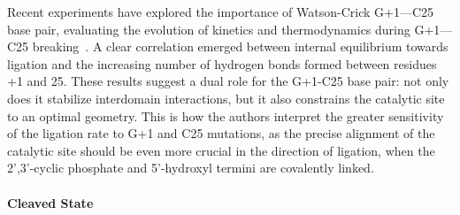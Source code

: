 \documentclass[journal=jacsat,manuscript=article]{achemso}
\begin{document}


Recent experiments have explored the importance of Watson-Crick G+1---C25 base pair,
evaluating the evolution of kinetics and thermodynamics during G+1---C25 breaking~\cite{cottrell_functional_2007}.
A clear correlation emerged between internal equilibrium towards ligation 
and the increasing number of hydrogen bonds formed between residues +1 and 25.
These results suggest a dual role for the G+1-C25 base pair: not only does it stabilize interdomain interactions,
but it also constrains the catalytic site to an optimal geometry.
This is how the authors interpret the greater sensitivity of the ligation rate to G+1 and C25 mutations,
as the precise alignment of the catalytic site should be even more crucial in the direction of ligation,
when the 2',3'-cyclic phosphate and 5'-hydroxyl termini are covalently linked.\\


\paragraph{Cleaved State}
\end{document}
